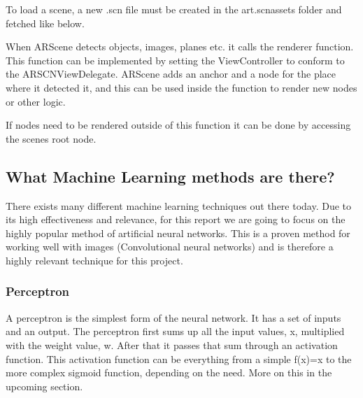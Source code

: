 To load a scene, a new .scn file must be created in the art.scnassets folder and fetched like below.


When ARScene detects objects, images, planes etc. it calls the renderer function. This function can be implemented by setting the ViewController to conform to the ARSCNViewDelegate. ARScene adds an anchor and a node for the place where it detected it, and this can be used inside the function to render new nodes or other logic.



If nodes need to be rendered outside of this function it can be done by accessing the
scenes root node.



\subsection{What Machine Learning methods are there?}
There exists many different machine learning techniques out there today. Due to its high effectiveness and relevance, for this report we are going to focus on the highly popular method of artificial neural networks.
This is a proven method for working well with images (Convolutional neural networks) and is therefore a highly 
relevant technique for this project.

\subsubsection{Perceptron}
A perceptron is the simplest form of the neural network. It has a set of inputs and an output.
The perceptron first sums up all the input values, x, multiplied with the weight value, w.
After that it passes that sum through an activation function. This activation function can be everything from a simple f(x)=x to the more complex sigmoid function, depending on the need. More on this in the upcoming section.

